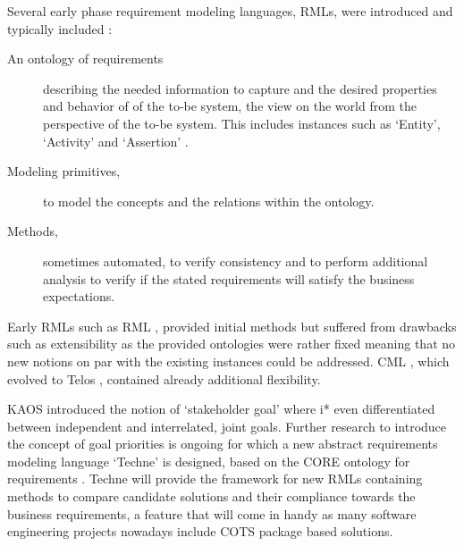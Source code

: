 Several early phase requirement modeling languages, RMLs, were introduced and typically included : 
\begin{description}
	\item[An ontology of requirements] describing the needed information to capture and the desired properties and behavior of of the to-be system, the view on the world from the perspective of the to-be system. This includes instances such as `Entity', `Activity' and `Assertion' .
	\item[Modeling primitives,] to model the concepts and the relations within the ontology.
	\item[Methods,] sometimes automated, to verify consistency and to perform additional analysis to verify if the stated requirements will satisfy the business expectations.
\end{description}

\noindent
{}


Early RMLs such as RML , provided initial methods but suffered from drawbacks such as extensibility as the provided ontologies were rather fixed meaning that no new notions on par with the existing instances could be addressed. CML , which evolved to Telos , contained already additional flexibility. 

KAOS  introduced the notion of `stakeholder goal' where i*  even differentiated between independent and interrelated, joint goals.
Further research to introduce the concept of goal priorities is ongoing for which a new abstract requirements modeling language `Techne'  is designed, based on the CORE ontology for requirements . Techne will provide the framework for new RMLs containing methods to compare candidate solutions and their compliance towards the business requirements, a feature that will come in handy as many software engineering projects nowadays include COTS package based solutions.

